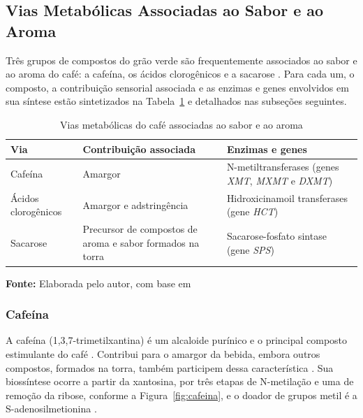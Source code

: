 \subsection{Vias Metabólicas Associadas ao Sabor e ao Aroma}

Três grupos de compostos do grão verde são frequentemente associados ao sabor e ao aroma do café: a cafeína, os ácidos clorogênicos e a sacarose \cite{Ludwig2014}. Para cada um, o composto, a contribuição sensorial associada e as enzimas e genes envolvidos em sua síntese estão sintetizados na Tabela~\ref{tab:vias} e detalhados nas subseções seguintes.

\FloatBarrier
\begin{table}[!htbp]
	\centering
	\SingleSpacing\small
	\caption{Vias metabólicas do café associadas ao sabor e ao aroma}
	\begin{tabularx}{\textwidth}{@{}lXX@{}}
		\toprule
		\textbf{Via} & \textbf{Contribuição associada} & \textbf{Enzimas e genes} \\
		\midrule
		Cafeína           & Amargor                                                  & N-metiltransferases (genes \textit{XMT}, \textit{MXMT} e \textit{DXMT}) \\
		Ácidos clorogênicos & Amargor e adstringência                                & Hidroxicinamoil transferases (gene \textit{HCT}) \\
		Sacarose          & Precursor de compostos de aroma e sabor formados na torra            & Sacarose-fosfato sintase (gene \textit{SPS}) \\
		\bottomrule
	\end{tabularx}
	\par\vspace{0.2cm}
	\textbf{Fonte:} Elaborada pelo autor, com base em 
	\label{tab:vias}
\end{table}
\FloatBarrier

\subsubsection{Cafeína}

A cafeína (1,3,7-trimetilxantina) é um alcaloide purínico e o principal composto estimulante do café \cite{Ludwig2014}. Contribui para o amargor da bebida, embora outros compostos, formados na torra, também participem dessa característica \cite{Buffo2004, Ludwig2014}. Sua biossíntese ocorre a partir da xantosina, por três etapas de N-metilação e uma de remoção da ribose, conforme a Figura~\ref{fig:cafeina}, e o doador de grupos metil é a S-adenosilmetionina \cite{Uefuji2003}.

